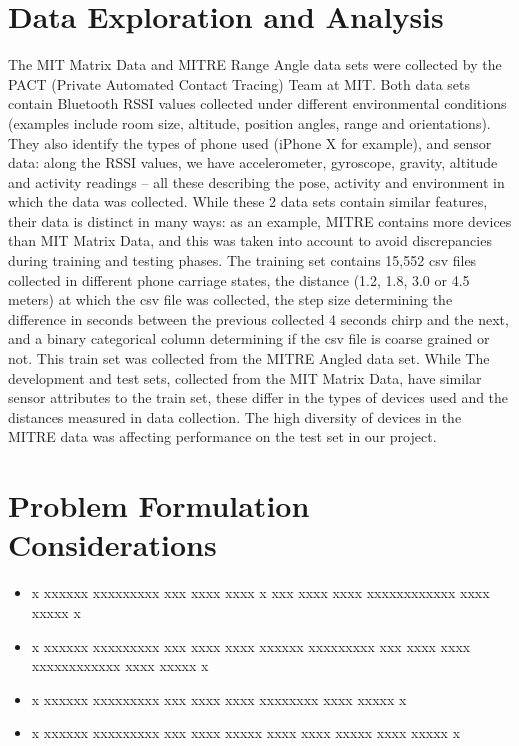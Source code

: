 \documentclass[conference]{IEEEtran}
\begin{document}
 \section{Data Exploration and Analysis}
The MIT Matrix Data \cite{b6} and MITRE Range Angle \cite{b7} data sets were collected by the PACT (Private Automated Contact Tracing) Team at MIT. Both  data sets contain Bluetooth RSSI values collected under different environmental conditions (examples include room size, altitude, position angles, range and orientations). They also identify the types of phone used (iPhone X for example), and sensor data: along the RSSI values, we have accelerometer, gyroscope, gravity, altitude and activity readings – all these describing the pose, activity and environment in which the data was collected. While these 2 data sets contain similar features, their data is distinct in many ways: as an example, MITRE contains more devices than MIT Matrix Data, and this was taken into account to avoid discrepancies during training and testing phases.  The training set contains 15,552 csv files collected in different phone carriage states, the distance (1.2, 1.8, 3.0 or 4.5 meters) at which the csv file was collected, the step size determining the difference in seconds between the previous collected 4 seconds chirp and the next, and a binary categorical column determining if the csv file is coarse grained or not. This train set was collected from the MITRE Angled data set. While The development and test sets, collected from the MIT Matrix Data, have similar sensor attributes to the train set, these differ in the types of devices used and the distances measured in data collection. The high diversity of devices in the MITRE data was affecting performance on the test set in our project.\\


\section{Problem Formulation Considerations}

\begin{itemize}
\item x xxxxxx xxxxxxxxx xxx xxxx xxxx x xxx xxxx xxxx xxxxxxxxxxxx xxxx xxxxx x
\item x xxxxxx xxxxxxxxx xxx xxxx xxxx xxxxxx xxxxxxxxx xxx xxxx xxxx xxxxxxxxxxxx xxxx xxxxx x
\item x xxxxxx xxxxxxxxx xxx xxxx xxxx xxxxxxxx xxxx xxxxx x
\item x xxxxxx xxxxxxxxx xxx xxxx xxxxx xxxx xxxx xxxxx xxxx xxxxx x

\end{itemize}
\end{document}
